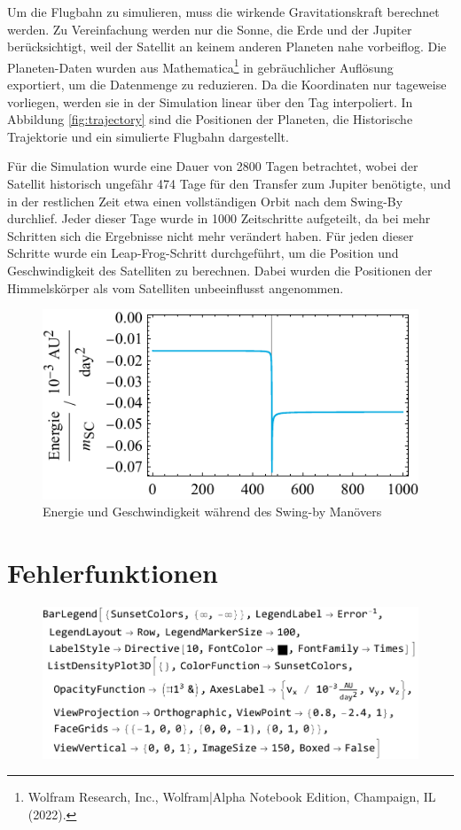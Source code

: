 Um die Flugbahn zu simulieren, muss die wirkende Gravitationskraft berechnet werden.
Zu Vereinfachung werden nur die Sonne, die Erde und der Jupiter berücksichtigt, weil der Satellit an keinem anderen Planeten nahe vorbeiflog.
Die Planeten-Daten wurden aus Mathematica\footnote{Wolfram Research, Inc., Wolfram|Alpha Notebook Edition, Champaign, IL (2022).} in gebräuchlicher Auflösung exportiert, um die Datenmenge zu reduzieren.
Da die Koordinaten nur tageweise vorliegen, werden sie in der Simulation linear über den Tag interpoliert.
In Abbildung \ref{fig:trajectory} sind die Positionen der Planeten, die Historische Trajektorie und ein simulierte Flugbahn dargestellt.

Für die Simulation wurde eine Dauer von 2800 Tagen betrachtet, wobei der Satellit historisch ungefähr 474 Tage für den Transfer zum Jupiter benötigte, und in der restlichen Zeit etwa einen vollständigen Orbit nach dem Swing-By durchlief.
Jeder dieser Tage wurde in 1000 Zeitschritte aufgeteilt, da bei mehr Schritten sich die Ergebnisse nicht mehr verändert haben.
Für jeden dieser Schritte wurde ein Leap-Frog-Schritt durchgeführt, um die Position und Geschwindigkeit des Satelliten zu berechnen. Dabei wurden die Positionen der Himmelskörper als vom Satelliten unbeeinflusst angenommen.


\begin{figure}[h!]
	\centering
	\includegraphics{img/energy.pdf}
	\caption{Energie und Geschwindigkeit während des Swing-by Manövers}
\end{figure}


\section{Fehlerfunktionen}
\begin{figure}[h!]
	\centering
	\includegraphics{img/gridSearch.pdf}
\end{figure}

